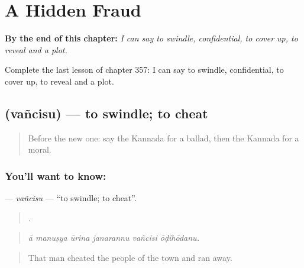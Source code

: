 
\chapter{A Hidden Fraud}
\label{ch:ka-a-hidden-fraud}

\begin{chapteropening}
\textbf{By the end of this chapter:} \emph{I can say to swindle, confidential, to cover up, to reveal and a plot.}

Complete the last lesson of chapter 357: I can say to swindle, confidential, to cover up, to reveal and a plot.
\end{chapteropening}

\section[\texorpdfstring{\kn{ವಂಚಿಸು} (vañcisu)}{ವಂಚಿಸು (vañcisu)}]{ (vañcisu) — to swindle; to cheat}

\label{lesson:KA-C357-vancisu}



\begin{quote}
Before the new one: say the Kannada for a ballad, then the Kannada for a moral.
\end{quote}

\subsection*{You'll want to know: }
\textbf{} — \emph{vañcisu} — \textquotedblleft{}to swindle; to cheat\textquotedblright{}.

\begin{quote}
     .
\end{quote}

\begin{quote}
\emph{ā manuṣya ūrina janarannu vañcisi ōḍihōdanu.}
\end{quote}

\begin{quote}
That man cheated the people of the town and ran away.
\end{quote}

